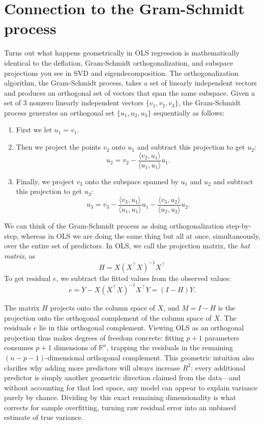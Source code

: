 \documentclass{article}
\begin{document}
\section{Connection to the Gram-Schmidt process}
Turns out what happens geometrically in OLS regression is mathematically identical to the deflation, Gram-Schmidt orthogonalization, and subspace projections you see in SVD and eigendecomposition. The orthogonalization algorithm, the Gram-Schmidt process, takes a set of linearly independent vectors and produces an orthogonal set of vectors that span the same subspace. Given a set of 3 nonzero linearly independent vectors $\{v_1, v_2, v_3\}$, the Gram-Schmidt process generates an orthogonal set $\{u_1, u_2, u_3\}$ sequentially as follows:
\begin{enumerate}
  \item First we let $u_1 = v_1$.
  \item Then we project the points $v_2$ onto $u_1$ and subtract this projection to get $u_2$:
\[
  u_2 = v_2 - \frac{\langle v_2, u_1 \rangle}{\langle u_1, u_1 \rangle} u_1.
\]
  \item Finally, we project $v_3$ onto the subspace spanned by $u_1$ and $u_2$ and subtract this projection to get $u_3$:
\[
  u_3 = v_3 - \frac{\langle v_3, u_1 \rangle}{\langle u_1, u_1 \rangle} u_1 - \frac{\langle v_3, u_2 \rangle}{\langle u_2, u_2 \rangle} u_2.
\]
\end{enumerate}

We can think of the Gram-Schmidt process as doing orthogonalization step-by-step, whereas in OLS we are doing the same thing but all at once, simultaneously, over the entire set of predictors. In OLS, we call the projection matrix, the \emph{hat matrix}, as
\[
  H = X(X^\top X)^{-1} X^\top
\]
To get residual $e$, we subtract the fitted values from the observed values:
\[e = Y - X(X^\top X)^{-1} X^\top Y = (I - H)Y.\]

The matrix $H$ projects onto the column space of $X$, and $M = I - H$ is the projection onto the orthogonal complement of the column space of $X$. The residuals $e$ lie in this orthogonal complement. Viewing OLS as an orthogonal projection thus makes degrees of freedom concrete: fitting $p+1$ parameters consumes $p+1$ dimensions of $\mathbb{R}^n$, trapping the residuals in the remaining $(n - p - 1)$-dimensional orthogonal complement. This geometric intuition also clarifies why adding more predictors will always increase $R^2$: every additional predictor is simply another geometric direction claimed from the data—and without accounting for that lost space, any model can appear to explain variance purely by chance. Dividing by this exact remaining dimensionality is what corrects for sample overfitting, turning raw residual error into an unbiased estimate of true variance.
\end{document}
